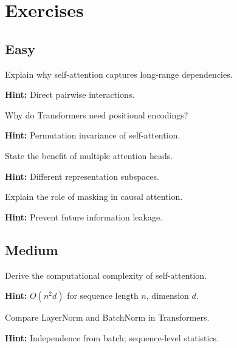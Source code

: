 
\section*{Exercises}

\subsection*{Easy}

\begin{problem}
Explain why self-attention captures long-range dependencies.

\textbf{Hint:} Direct pairwise interactions.
\end{problem}

\begin{problem}
Why do Transformers need positional encodings?

\textbf{Hint:} Permutation invariance of self-attention.
\end{problem}

\begin{problem}
State the benefit of multiple attention heads.

\textbf{Hint:} Different representation subspaces.
\end{problem}

\begin{problem}
Explain the role of masking in causal attention.

\textbf{Hint:} Prevent future information leakage.
\end{problem}

\subsection*{Medium}

\begin{problem}
Derive the computational complexity of self-attention.

\textbf{Hint:} $O(n^2 d)$ for sequence length $n$, dimension $d$.
\end{problem}

\begin{problem}
Compare LayerNorm and BatchNorm in Transformers.

\textbf{Hint:} Independence from batch; sequence-level statistics.
\end{problem}

